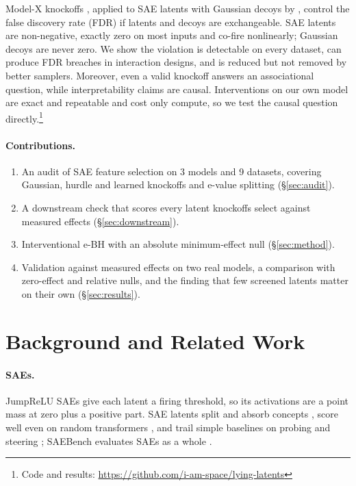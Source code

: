 Model-X knockoffs \citep{candes2018panning}, applied to SAE latents with Gaussian decoys by
\citet{enkhbayar2025}, control the false discovery rate (FDR) if latents and decoys are exchangeable.
SAE latents are non-negative, exactly zero on most inputs and co-fire nonlinearly; Gaussian decoys are
never zero. We show the violation is detectable on every dataset, can produce FDR breaches in interaction designs, and
is reduced but not removed by better samplers. Moreover, even a valid knockoff answers an associational question, while interpretability
claims are causal. Interventions on our own model are exact and repeatable and cost only compute, so we test the causal
question directly.\footnote{Code and results: \url{https://github.com/i-am-space/lying-latents}}

\paragraph{Contributions.}
\begin{enumerate}[leftmargin=*,itemsep=1pt,topsep=2pt]
  \item An audit of SAE feature selection on 3 models and 9 datasets, covering Gaussian, hurdle and learned knockoffs
        and e-value splitting (\S\ref{sec:audit}).
  \item A downstream check that scores every latent knockoffs select against measured effects (\S\ref{sec:downstream}).
  \item Interventional e-BH with an absolute minimum-effect null (\S\ref{sec:method}).
  \item Validation against measured effects on two real models, a comparison with zero-effect and relative nulls,
        and the finding that few screened latents matter on their own (\S\ref{sec:results}).
\end{enumerate}

\section{Background and Related Work}
\label{sec:background}

\paragraph{SAEs.} JumpReLU SAEs \citep{rajamanoharan2024jumping, lieberum2024gemma} give each latent a
firing threshold, so its activations are a point mass at zero plus a positive part. SAE latents split
and absorb concepts \citep{chanin2024absorption}, score well even on random transformers
\citep{heap2025random}, and trail simple baselines on probing and steering
\citep{kantamneni2025sparse, wu2025axbench}; SAEBench evaluates SAEs as a whole
\citep{karvonen2025saebench}.


